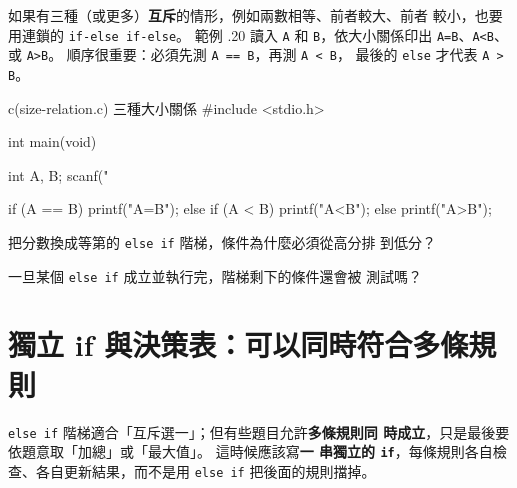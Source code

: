 
如果有三種（或更多）\textbf{互斥}的情形，例如兩數相等、前者較大、前者
較小，也要用連鎖的 \texttt{if-else if-else}。 範例 \thechapter.20 讀入
\texttt{A} 和 \texttt{B}，依大小關係印出 \texttt{A=B}、\texttt{A<B}、或
\texttt{A>B}。 順序很重要：必須先測 \texttt{A == B}，再測 \texttt{A < B}，
最後的 \texttt{else} 才代表 \texttt{A > B}。

\begin{example}{c}{(size-relation.c) 三種大小關係}
#include <stdio.h>

int main(void) {
    int A, B;
    scanf("%

    if (A == B) {
        printf("A=B\n");
    } else if (A < B) {
        printf("A<B\n");
    } else {
        printf("A>B\n");
    }
}
\end{example}



\begin{drills}[label=drills:cond-else-if-ladder]
\item 把分數換成等第的 \texttt{else if} 階梯，條件為什麼必須從高分排
到低分？
\item 一旦某個 \texttt{else if} 成立並執行完，階梯剩下的條件還會被
測試嗎？
\end{drills}

\section{獨立 if 與決策表：可以同時符合多條規則}
\label{sec:cond-independent-if}

\texttt{else if} 階梯適合「互斥選一」；但有些題目允許\textbf{多條規則同
時成立}，只是最後要依題意取「加總」或「最大值」。 這時候應該寫\textbf{一
串獨立的 \texttt{if}}，每條規則各自檢查、各自更新結果，而不是用
\texttt{else if} 把後面的規則擋掉。

